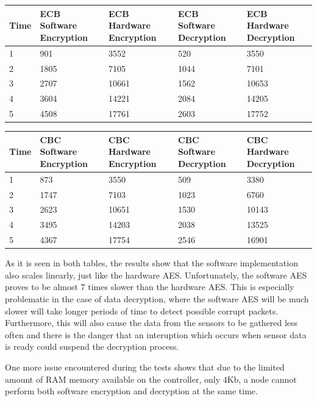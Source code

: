 \\
\\

\begin{tabular}{ | l | p{1.5cm} | p{1.5cm} | p{1.5cm} | p{1.5cm} |}
    \hline
    Time & ECB Software Encryption & ECB Hardware Encryption & ECB Software Decryption & ECB Hardware Decryption \\ \hline
    1 & 901 & 3552 & 520 & 3550 \\ \hline
    2 & 1805 & 7105 & 1044 & 7101 \\ \hline
    3 & 2707 & 10661 & 1562 & 10653\\ \hline
    4 & 3604 & 14221 & 2084 & 14205\\ \hline
    5 & 4508 & 17761 & 2603 & 17752\\ \hline
\end{tabular}


\begin{tabular}{ | l | p{1.5cm} | p{1.5cm} | p{1.5cm} | p{1.5cm} |}
    \hline
    Time & CBC Software Encryption & CBC Hardware Encryption & CBC Software Decryption & CBC Hardware Decryption \\ \hline
    1 & 873 & 3550 & 509 & 3380 \\ \hline
    2 & 1747 & 7103 & 1023 & 6760 \\ \hline
    3 & 2623 & 10651 & 1530 & 10143 \\ \hline
    4 & 3495 & 14203 & 2038 & 13525 \\ \hline
    5 & 4367 & 17754 & 2546 & 16901\\ \hline
\end{tabular}

As it is seen in both tables, the results show that the software implementation also 
scales linearly, just like the hardware AES. Unfortunately, the software AES proves to 
be almost 7 times slower than the hardware AES. This is especially problematic in the 
case of data decryption, where the software AES will be much slower will take longer 
periods of time to detect possible corrupt packets. Furthermore, this will also cause 
the data from the sensors to be gathered less often and there is the danger that 
an interuption which occurs when sensor data is ready could suspend the decryption 
process.

One more issue encountered during the tests shows that due to the limited amount of 
RAM memory available on the controller, only 4Kb, a node cannot perform both software 
encryption and decryption at the same time.

